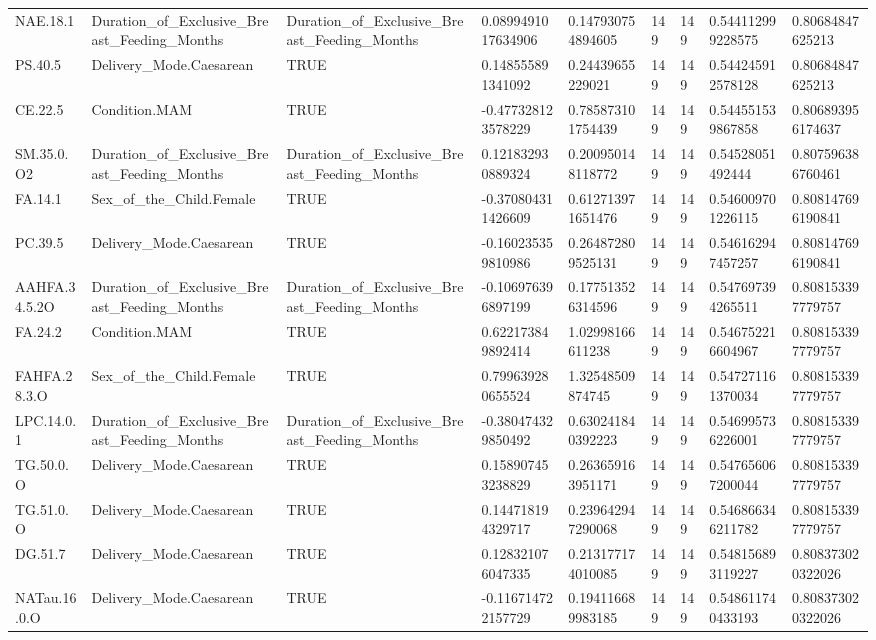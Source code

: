 \begin{longtable}{lllllllll}
NAE.18.1 & Duration\_of\_Exclusive\_Breast\_Feeding\_Months & Duration\_of\_Exclusive\_Breast\_Feeding\_Months & 0.0899491017634906 & 0.147930754894605 & 149 & 149 & 0.544112999228575 & 0.80684847625213 \\
PS.40.5 & Delivery\_Mode.Caesarean & TRUE & 0.148555891341092 & 0.24439655229021 & 149 & 149 & 0.544245912578128 & 0.80684847625213 \\
CE.22.5 & Condition.MAM & TRUE & -0.477328123578229 & 0.785873101754439 & 149 & 149 & 0.544551539867858 & 0.806893956174637 \\
SM.35.0.O2 & Duration\_of\_Exclusive\_Breast\_Feeding\_Months & Duration\_of\_Exclusive\_Breast\_Feeding\_Months & 0.121832930889324 & 0.200950148118772 & 149 & 149 & 0.54528051492444 & 0.807596386760461 \\
FA.14.1 & Sex\_of\_the\_Child.Female & TRUE & -0.370804311426609 & 0.612713971651476 & 149 & 149 & 0.546009701226115 & 0.808147696190841 \\
PC.39.5 & Delivery\_Mode.Caesarean & TRUE & -0.160235359810986 & 0.264872809525131 & 149 & 149 & 0.546162947457257 & 0.808147696190841 \\
AAHFA.34.5.2O & Duration\_of\_Exclusive\_Breast\_Feeding\_Months & Duration\_of\_Exclusive\_Breast\_Feeding\_Months & -0.106976396897199 & 0.177513526314596 & 149 & 149 & 0.547697394265511 & 0.808153397779757 \\
FA.24.2 & Condition.MAM & TRUE & 0.622173849892414 & 1.02998166611238 & 149 & 149 & 0.546752216604967 & 0.808153397779757 \\
FAHFA.28.3.O & Sex\_of\_the\_Child.Female & TRUE & 0.799639280655524 & 1.32548509874745 & 149 & 149 & 0.547271161370034 & 0.808153397779757 \\
LPC.14.0.1 & Duration\_of\_Exclusive\_Breast\_Feeding\_Months & Duration\_of\_Exclusive\_Breast\_Feeding\_Months & -0.380474329850492 & 0.630241840392223 & 149 & 149 & 0.546995736226001 & 0.808153397779757 \\
TG.50.0.O & Delivery\_Mode.Caesarean & TRUE & 0.158907453238829 & 0.263659163951171 & 149 & 149 & 0.547656067200044 & 0.808153397779757 \\
TG.51.0.O & Delivery\_Mode.Caesarean & TRUE & 0.144718194329717 & 0.239642947290068 & 149 & 149 & 0.546866346211782 & 0.808153397779757 \\
DG.51.7 & Delivery\_Mode.Caesarean & TRUE & 0.128321076047335 & 0.213177174010085 & 149 & 149 & 0.548156893119227 & 0.808373020322026 \\
NATau.16.0.O & Delivery\_Mode.Caesarean & TRUE & -0.116714722157729 & 0.194116689983185 & 149 & 149 & 0.548611740433193 & 0.808373020322026 \\

\end{longtable}
